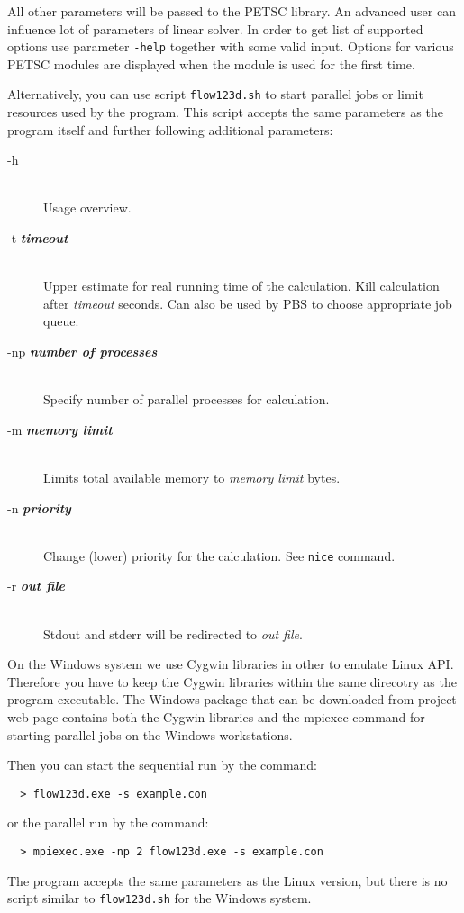 \documentclass[12pt,a4paper]{report}
\begin{document}
All other parameters will be passed to the PETSC library. An advanced user can influence lot of parameters of linear solver. In order to get list of supported options 
use parameter \verb'-help' together with some valid input. Options for various PETSC modules are displayed when the module is used for the first time.


Alternatively, you can use script \verb'flow123d.sh' to start parallel jobs or limit resources used by the program. 
This script accepts the same parameters as the program itself
and further following additional parameters:

\begin{description}
  \item[-h] \hfill\\
  	Usage overview.
  \item[-t {\bf\it timeout}] \hfill\\
  	Upper estimate for real running time of the calculation. Kill calculation after {\it timeout} seconds. 
  	Can also be used by PBS to choose appropriate job queue. 
  \item[-np {\bf\it number of processes}] \hfill\\
  	Specify number of parallel processes for calculation.
  \item[-m {\bf\it memory limit}] \hfill\\
  	Limits total available memory to {\it memory limit} bytes.
  \item[-n {\bf\it priority}] \hfill\\
  	Change (lower) priority for the calculation. See {\tt nice} command.
  \item[-r {\bf\it out file}] \hfill\\
  	Stdout and stderr will be redirected to {\it out file}.
\end{description}

On the Windows system we use Cygwin libraries in other to emulate Linux API.
Therefore you have to keep the Cygwin libraries within the same direcotry as the program executable.
The Windows package that can be downloaded from project web page contains both the Cygwin libraries
and the mpiexec command for starting parallel jobs on the Windows workstations.

Then you can start the sequential run by the command:
\begin{verbatim}
  > flow123d.exe -s example.con
\end{verbatim}
or the parallel run by the command:
\begin{verbatim}
  > mpiexec.exe -np 2 flow123d.exe -s example.con
\end{verbatim}
The program accepts the same parameters as the Linux version, but there is no script similar to \verb'flow123d.sh' for the Windows system.
\end{document}
